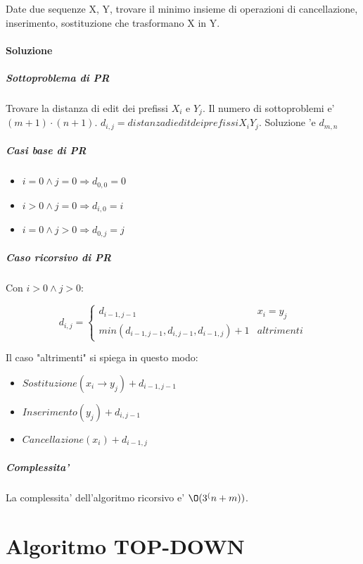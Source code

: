 Date due sequenze X, Y, trovare il minimo insieme di operazioni di cancellazione, inserimento, sostituzione che trasformano X in Y.

\paragraph{Soluzione}

\subparagraph{Sottoproblema di PR}

Trovare la distanza di edit dei prefissi $X_i$ e $Y_j$.
Il numero di sottoproblemi e' $(m+1) \cdot (n+1)$.
$d_{i,j} = distanza di edit dei prefissi X_i Y_j$.
Soluzione 'e $d_{m, n}$

\subparagraph{Casi base di PR}

\begin{itemize}
    \item $i = 0 \land j = 0 \Rightarrow d_{0,0} = 0$
    \item $i > 0 \land j = 0 \Rightarrow d_{i,0} = i$
    \item $i = 0 \land j > 0 \Rightarrow d_{0,j} = j$
\end{itemize}

\subparagraph{Caso ricorsivo di PR}

Con $i > 0 \land j > 0$:

\[
    \text{$d_{i,j}$} =
    \begin{cases}
      \text{$d_{i-1, j-1}$} & \text{$x_i = y_j$} \\
      \text{$min(d_{i-1, j-1}, d_{i, j-1}, d_{i-1, j}) + 1$} & altrimenti
    \end{cases}
\]

Il caso "altrimenti" si spiega in questo modo:
\begin{itemize}
    \item $Sostituzione(x_i \rightarrow y_j) + d_{i-1, j-1}$
    \item $Inserimento(y_j) + d_{i,j-1}$
    \item $Cancellazione(x_i) + d_{i-1, j}$
\end{itemize}

\subparagraph{Complessita'}

La complessita' dell'algoritmo ricorsivo e' $\O(3^(n+m))$.

\section{Algoritmo TOP-DOWN}

